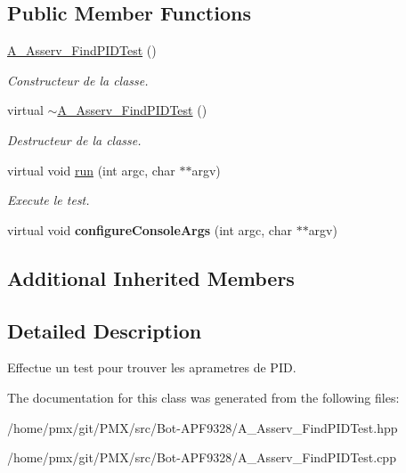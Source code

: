 \subsection*{Public Member Functions}
\begin{DoxyCompactItemize}
\item 
\mbox{\label{classA__Asserv__FindPIDTest_a6eb93ed5bd8026681d847e3fb7e1073e}} 
\hyperlink{classA__Asserv__FindPIDTest_a6eb93ed5bd8026681d847e3fb7e1073e}{A\+\_\+\+Asserv\+\_\+\+Find\+P\+I\+D\+Test} ()
\begin{DoxyCompactList}\small\item\em Constructeur de la classe. \end{DoxyCompactList}\item 
\mbox{\label{classA__Asserv__FindPIDTest_a66a6be8b078f42d51a530431b346241b}} 
virtual \hyperlink{classA__Asserv__FindPIDTest_a66a6be8b078f42d51a530431b346241b}{$\sim$\+A\+\_\+\+Asserv\+\_\+\+Find\+P\+I\+D\+Test} ()
\begin{DoxyCompactList}\small\item\em Destructeur de la classe. \end{DoxyCompactList}\item 
\mbox{\label{classA__Asserv__FindPIDTest_acc445eae5445a7f0add802f1bc34851e}} 
virtual void \hyperlink{classA__Asserv__FindPIDTest_acc445eae5445a7f0add802f1bc34851e}{run} (int argc, char $\ast$$\ast$argv)
\begin{DoxyCompactList}\small\item\em Execute le test. \end{DoxyCompactList}\item 
\mbox{\label{classA__Asserv__FindPIDTest_a9c64c65c189c232963bd304ba8d06c05}} 
virtual void {\bfseries configure\+Console\+Args} (int argc, char $\ast$$\ast$argv)
\end{DoxyCompactItemize}
\subsection*{Additional Inherited Members}


\subsection{Detailed Description}
Effectue un test pour trouver les aprametres de P\+ID. 

The documentation for this class was generated from the following files\+:\begin{DoxyCompactItemize}
\item 
/home/pmx/git/\+P\+M\+X/src/\+Bot-\/\+A\+P\+F9328/A\+\_\+\+Asserv\+\_\+\+Find\+P\+I\+D\+Test.\+hpp\item 
/home/pmx/git/\+P\+M\+X/src/\+Bot-\/\+A\+P\+F9328/A\+\_\+\+Asserv\+\_\+\+Find\+P\+I\+D\+Test.\+cpp\end{DoxyCompactItemize}
